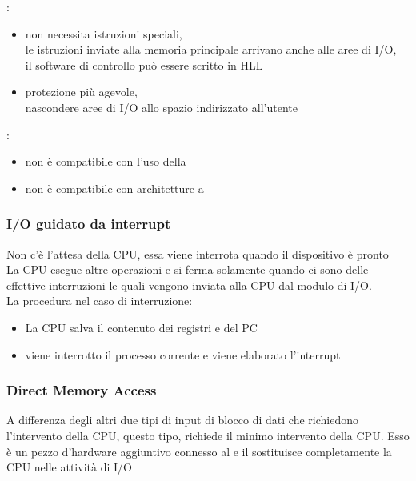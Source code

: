 \documentclass[arch.tex]{subfiles}
\begin{document}
%
\label{ppar:I/O memory mapped}
:

\begin{itemize}
	\item non necessita istruzioni speciali,\\
		le istruzioni inviate alla memoria principale arrivano anche alle aree di I/O,\\
		il software di controllo può essere scritto in HLL
	\item protezione più agevole,\\
		nascondere aree di I/O allo spazio indirizzato all'utente
\end{itemize}

:

\begin{itemize}
	\item non è compatibile con l'uso della 
	\item non è compatibile con architetture a 
\end{itemize}

\subsubsection{I/O guidato da interrupt}
Non c'è l'attesa della CPU, essa viene interrota  quando il dispositivo è pronto\\
La CPU esegue altre operazioni e si ferma  solamente quando ci sono delle 
effettive interruzioni le quali vengono inviata alla CPU dal modulo di I/O.\\
La procedura nel caso di interruzione:

\begin{itemize}
	\item La CPU salva il contenuto dei registri e del PC
	\item viene interrotto il processo corrente e viene elaborato l'interrupt
\end{itemize}

\subsubsection{Direct Memory Access}
A differenza degli altri due tipi di input di blocco di dati che richiedono l'intervento 
 della CPU, questo tipo, richiede il minimo intervento della CPU.
Esso è un pezzo d'hardware aggiuntivo connesso al  e il  
sostituisce  completamente la CPU nelle attività di I/O
%
\label{ppar:Modulo DMA}
\end{document}

